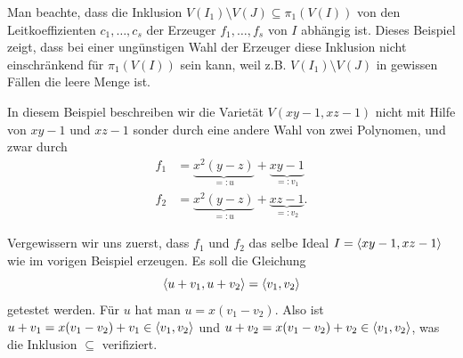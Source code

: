 \documentclass[11pt]{article}
\numberwithin{equation}{section}
\begin{document}
\begin{beispiel}
	Man beachte, dass die Inklusion $V(I_1) \setminus V(J) \subseteq \pi_1(V(I))$ von den Leitkoeffizienten $c_1,\ldots,c_s$ der Erzeuger $f_1,\ldots,f_s $ von $I$ abhängig ist. Dieses Beispiel zeigt, dass bei einer ungünstigen Wahl der Erzeuger diese Inklusion nicht einschränkend für $\pi_1(V(I))$ sein kann, weil z.B. $V(I_1) \setminus V(J)$ in gewissen Fällen die leere Menge ist. 
	
	
	In diesem Beispiel beschreiben wir die Varietät $V(x y - 1, x z -1)$ nicht mit Hilfe von $xy - 1$ und $x z -1$ sonder durch eine andere Wahl von zwei Polynomen, und zwar durch 
\begin{align*} 
	f_1 & =  \underbrace{x^2 (y-z)}_{=:u}+ \underbrace{xy -1}_{=:v_1}
	\\ f_2 & = \underbrace{ x^2 (y-z)}_{=:u} + \underbrace{ xz -1}_{=:v_2}. 
\end{align*} 

Vergewissern wir uns zuerst, dass $f_1$ und $f_2$ das selbe Ideal $I = \left< xy -1, x z -1 \right>$ wie im vorigen Beispiel erzeugen. Es soll die Gleichung 
\[
	\left< u+v_1, u+ v_2 \right> = \left< v_1, v_2 \right>
\]
getestet werden. Für $u$ hat man $u = x (v_1 - v_2)$. Also ist $u+v_1 = x(v_1 -v_2) + v_1 \in \left< v_1,v_2 \right>$ und $u+ v_2 = x(v_1 -v_2) + v_2 \in \left< v_1,v_2 \right>$, was die Inklusion $\subseteq$ verifiziert.


\end{beispiel}
\end{document}
